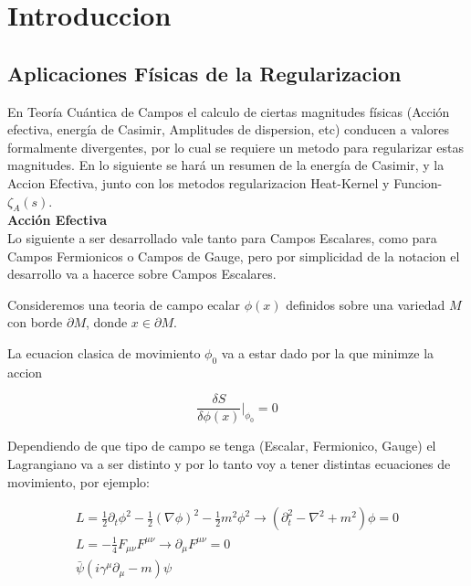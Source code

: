 \chapter{Introduccion}


\section{Aplicaciones Físicas de la Regularizacion}

En Teoría Cuántica de Campos el calculo de ciertas magnitudes físicas (Acción efectiva, energía de Casimir, Amplitudes de dispersion, etc) conducen a valores formalmente divergentes, por lo cual se requiere un metodo para regularizar estas magnitudes. En lo siguiente se hará un resumen de la energía de Casimir, y la Accion Efectiva, junto con los metodos regularizacion Heat-Kernel y Funcion-$ \zeta _A (s) $.\\





\textbf{Acción Efectiva}\\

Lo siguiente a ser desarrollado vale tanto para Campos Escalares, como para Campos Fermionicos o Campos de Gauge, pero por simplicidad de la notacion el desarrollo va a hacerce sobre Campos Escalares.

Consideremos una teoria de campo ecalar $\phi(x)$ definidos sobre una variedad $M$ con borde $\partial M$, donde $x \in \partial M$.

La ecuacion clasica de movimiento $ \phi _0 $ va a estar dado por la que minimze la accion 

\begin{equation}
\frac{\delta S}{\delta \phi (x)} | _{\phi _0} = 0
\end{equation}


Dependiendo de que tipo de campo se tenga (Escalar, Fermionico, Gauge) el Lagrangiano va a ser distinto y por lo tanto voy a tener distintas ecuaciones de movimiento, por ejemplo:

\begin{equation}
\begin{array}{c}
L = \frac{1}{2} \partial _t \phi ^2 - \frac{1}{2} ( \nabla \phi ) ^2 - \frac{1}{2} m ^2 \phi ^2 
\rightarrow 
\left(
	\partial _t ^2 - \nabla ^2 + m^2 
		\right) \phi = 0 \\
L = - \frac{1}{4} F _{\mu \nu} F ^{\mu \nu}
\rightarrow \partial _{\mu} F ^{\mu \nu} = 0
 \\
\bar{\psi} \left(
			i \gamma ^{\mu} \partial _{\mu} - m 
			\right) \psi 
\end{array}
\end{equation}

